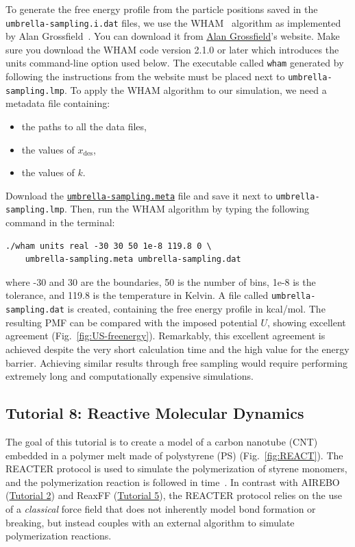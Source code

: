 \documentclass[9pt,tutorial]{livecoms}
\newcommand{\lmpcmd}[1]{\colorbox{listing}{\textcolor{command}{\small{#1}}}} %
\newcommand{\flecmd}[1]{\textcolor{command}{\texttt{#1}}} %
\newcommand{\dwlcmd}[1]{\textcolor{download}{\texttt{#1}}} %
\newcommand{\filepath}{https://raw.githubusercontent.com/lammpstutorials/lammpstutorials-article/main/files/}
\begin{document}
To generate the free energy profile from the particle positions saved in
the \flecmd{umbrella-sampling.i.dat} files, we use the
WHAM~\cite{kumar1992weighted,kumar1995multidim} algorithm as implemented
by Alan Grossfield~\cite{grossfieldimplementation}.  You can download it
from \href{http://membrane.urmc.rochester.edu/?page_id=126}{Alan
  Grossfield}'s website.  Make sure you download the WHAM code version
2.1.0 or later which introduces the \lmpcmd{units} command-line option
used below. The executable called \flecmd{wham} generated by following
the instructions from the website must be placed next to
\flecmd{umbrella-sampling.lmp}.  To apply the WHAM algorithm to our
simulation, we need a metadata file containing:
\begin{itemize}
\item the paths to all the data files,
\item the values of $x_\text{des}$,
\item the values of $k$.
\end{itemize}
Download the
\href{\filepath tutorial7/umbrella-sampling.meta}{\dwlcmd{umbrella-sampling.meta}}
file and save it next to \flecmd{umbrella-sampling.lmp}.  Then, run the
WHAM algorithm by typing the following command in the terminal:
\begin{lstlisting}
./wham units real -30 30 50 1e-8 119.8 0 \
    umbrella-sampling.meta umbrella-sampling.dat
\end{lstlisting}
where -30 and 30 are the boundaries, 50 is the number of bins, 1e-8 is the tolerance,
and 119.8 is the temperature in Kelvin.  A file called \flecmd{umbrella-sampling.dat} is created,
containing the free energy profile in kcal/mol.  The resulting PMF can be compared
with the imposed potential $U$, showing excellent agreement
(Fig.~\ref{fig:US-freenergy}).  Remarkably, this excellent agreement is achieved despite
the very short calculation time and the high value for the energy barrier.
Achieving similar results through free sampling would require performing extremely
long and computationally expensive simulations.

\subsection{Tutorial 8: Reactive Molecular Dynamics}
\label{bond-react-label}

The goal of this tutorial is to create a model of a carbon nanotube (CNT) embedded
in a polymer melt made of polystyrene (PS) (Fig.~\ref{fig:REACT}).  The
REACTER protocol is used to simulate the polymerization of styrene monomers, and the
polymerization reaction is followed in time~\cite{gissinger2017polymer, gissinger2020reacter, gissinger2024molecular}.
In contrast with AIREBO (\hyperref[carbon-nanotube-label]{Tutorial 2})
and ReaxFF (\hyperref[reactive-silicon-dioxide-label]{Tutorial 5}), the REACTER
protocol relies on the use of a \textit{classical} force field
that does not inherently model bond formation or breaking, but
instead couples with an external algorithm to simulate polymerization reactions.
\end{document}
